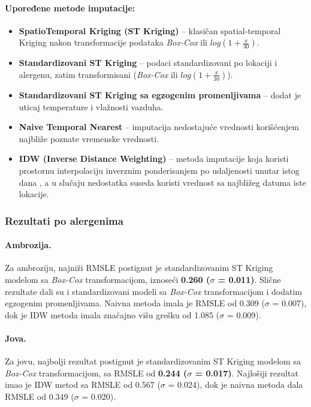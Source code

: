 \documentclass[12pt]{article}
\begin{document}
\vspace{0.3cm}
\noindent \paragraph{\textbf{Upoređene metode imputacije:}}

\begin{itemize}
    \item \textbf{SpatioTemporal Kriging (ST Kriging)} – klasičan spatial-temporal Kriging \cite{cressie1993statistics, chiles2012geostatistics} nakon transformacije podataka \textit{Box-Cox} ili $log(1+\tfrac{x}{30})$.
    \item \textbf{Standardizovani ST Kriging} – podaci standardizovani po lokaciji i alergenu, zatim transformisani (\textit{Box-Cox} ili $log(1+\tfrac{x}{30})$).
    \item \textbf{Standardizovani ST Kriging sa egzogenim promenljivama} – dodat je uticaj temperature i vlažnosti vazduha.
    \item \textbf{Naive Temporal Nearest} – imputacija nedostajuće vrednosti korišćenjem najbliže poznate vremenske vrednosti.
    \item \textbf{IDW (Inverse Distance Weighting)} – metoda imputacije koja koristi prostornu interpolaciju inverznim ponderisanjem po udaljenosti unutar istog dana \cite{shepard1968two}, a u slučaju nedostatka suseda koristi vrednost sa najbližeg datuma iste lokacije.
\end{itemize}


\subsubsection{Rezultati po alergenima}

\paragraph{Ambrozija.}
Za ambroziju, najniži RMSLE postignut je standardizovanim ST Kriging modelom sa \textit{Box-Cox} transformacijom, iznoseći \textbf{0.260 ($\sigma$ = 0.011)}. Slične rezultate dali su i standardizovani modeli sa \textit{Box-Cox}  transformacijom i dodatim egzogenim promenljivama. Naivna metoda imala je RMSLE od 0.309 ($\sigma$ = 0.007), dok je IDW metoda imala značajno višu grešku od 1.085 ($\sigma$ = 0.009).

\paragraph{Jova.}
Za jovu, najbolji rezultat postignut je standardizovanim ST Kriging modelom sa \textit{Box-Cox} transformacijom, sa RMSLE od \textbf{0.244 ($\sigma$ = 0.017)}. Najlošiji rezultat imao je IDW metod sa RMSLE od 0.567 ($\sigma$ = 0.024), dok je naivna metoda dala RMSLE od 0.349 ($\sigma$ = 0.020).
\end{document}
